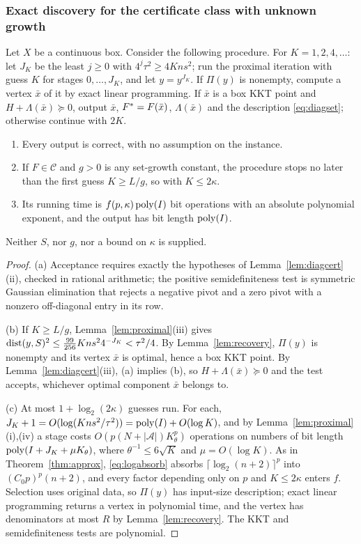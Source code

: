 \subsubsection{Exact discovery for the certificate class with unknown growth}

\begin{theorem}\label{thm:diagdiscovery}
Let $X$ be a continuous box. Consider the following procedure. For
$K=1,2,4,\ldots$: let $J_K$ be the least $j\ge0$ with $4^j\tau^2\ge4Kns^2$;
run the proximal iteration with guess $K$ for stages $0,\ldots,J_K$, and let
$y=y^{J_K}$. If $\Pi(y)$ is nonempty, compute a vertex $\bar x$ of it by
exact linear programming. If $\bar x$ is a box KKT point and
$H+\Lambda(\bar x)\succeq0$, output $\bar x$, $F^*=F(\bar x)$, $\Lambda(\bar x)$
and the description \eqref{eq:diagset}; otherwise continue with $2K$.
\begin{enumerate}
\item[(a)] Every output is correct, with no assumption on the instance.
\item[(b)] If $F\in\mathcal C$ and $g>0$ is any set-growth constant, the
procedure stops no later than the first guess $K\ge L/g$, so with $K\le2\kappa$.
\item[(c)] Its running time is $f(p,\kappa)\operatorname{poly}(I)$ bit operations with an
absolute polynomial exponent, and the output has bit length $\operatorname{poly}(I)$.
\end{enumerate}
Neither $S$, nor $g$, nor a bound on $\kappa$ is supplied.
\end{theorem}

\begin{proof}
(a) Acceptance requires exactly the hypotheses of
Lemma~\ref{lem:diagcert}(ii), checked in rational arithmetic; the positive
semidefiniteness test is symmetric Gaussian elimination that rejects a
negative pivot and a zero pivot with a nonzero off-diagonal entry in its row.

(b) If $K\ge L/g$, Lemma~\ref{lem:proximal}(iii) gives
$\operatorname{dist}(y,S)^2\le\frac{99}{256}Kns^24^{-J_K}<\tau^2/4$. By
Lemma~\ref{lem:recovery}, $\Pi(y)$ is nonempty and its vertex $\bar x$ is
optimal, hence a box KKT point. By Lemma~\ref{lem:diagcert}(iii), (a) implies
(b), so $H+\Lambda(\bar x)\succeq0$ and the test accepts, whichever optimal
component $\bar x$ belongs to.

(c) At most $1+\log_2(2\kappa)$ guesses run. For each,
$J_K+1=O(\log(Kns^2/\tau^2))=\operatorname{poly}(I)+O(\log K)$, and by
Lemma~\ref{lem:proximal}(i),(iv) a stage costs
$O(p(N+|\mathcal A|)K_\theta^p)$ operations on numbers of bit length
$\operatorname{poly}(I+J_K+\mu K_\theta)$, where $\theta^{-1}\le6\sqrt K$ and $\mu=O(\log K)$.
As in Theorem~\ref{thm:approx}, \eqref{eq:logabsorb} absorbs
$\lceil\log_2(n+2)\rceil^p$ into $(C_0p)^p(n+2)$, and every factor depending
only on $p$ and $K\le2\kappa$ enters $f$. Selection uses original data, so
$\Pi(y)$ has input-size description; exact linear programming returns a vertex
in polynomial time, and the vertex has denominators at most $R$ by
Lemma~\ref{lem:recovery}. The KKT and semidefiniteness tests are polynomial.
\end{proof}

